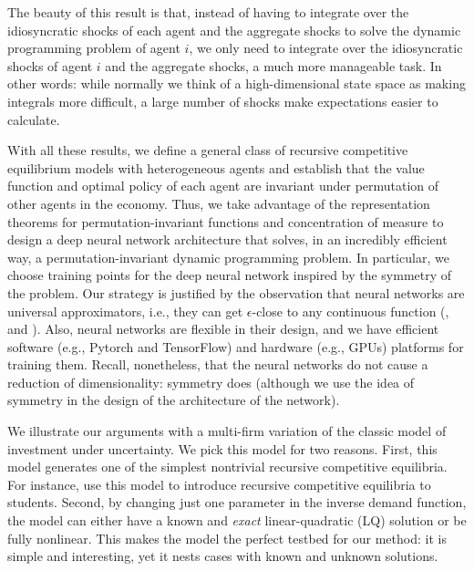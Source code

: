 \documentclass[12pt]{article}
\begin{document}
The beauty of this result is that, instead of having to integrate over the idiosyncratic shocks of each agent and the aggregate shocks to solve the dynamic programming problem of agent $i$, we only need to integrate over the idiosyncratic shocks of agent $i$ and the aggregate shocks, a much more manageable task. In other words: while normally we think of a high-dimensional state space as making integrals more difficult, a large number of shocks make expectations easier to calculate.

With all these results, we define a general class of recursive competitive equilibrium models with heterogeneous agents and establish that the value function and optimal policy of each agent are invariant under permutation of other agents in the economy.  Thus, we take advantage of the representation theorems for permutation-invariant functions and concentration of measure to design a deep neural network architecture that solves, in an incredibly efficient way, a permutation-invariant dynamic programming problem. In particular, we choose training points for the deep neural network inspired by the symmetry of the problem. Our strategy is justified by the observation that neural networks are universal approximators, i.e., they can get $\epsilon$-close to any continuous function (\citealp{cybenko1989approximation}, and \citealp{hornik1991approximation}). Also, neural networks are flexible in their design, and we have efficient software (e.g., Pytorch and TensorFlow) and hardware (e.g., GPUs) platforms for training them. Recall, nonetheless, that the neural networks do not cause a reduction of dimensionality: symmetry does (although we use the idea of symmetry in the design of the architecture of the network).

We illustrate our arguments with a multi-firm variation of the classic \citet{LucasPrescott1971} model of investment under uncertainty. We pick this model for two reasons. First, this model generates one of the simplest nontrivial recursive competitive equilibria. For instance, \citet[ch. 7]{LjungqvistSargent2018} use this model to introduce recursive competitive equilibria to students. Second, by changing just one parameter in the inverse demand function, the model can either have a known and \textit{exact} linear-quadratic (LQ) solution or be fully nonlinear. This makes the \citet{LucasPrescott1971} model the perfect testbed for our method: it is simple and interesting, yet it nests cases with known and unknown solutions.
\end{document}
